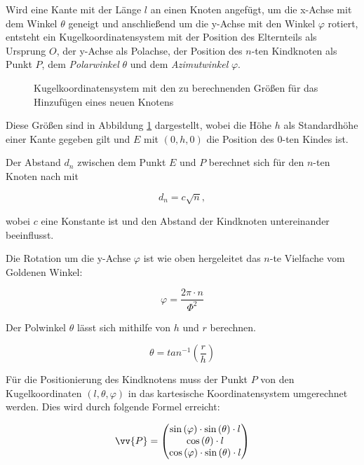 Wird eine Kante mit der Länge $l$ an einen Knoten angefügt, um die x-Achse mit dem Winkel $\theta$ geneigt und anschließend um die y-Achse mit den Winkel $\varphi$ rotiert, entsteht ein Kugelkoordinatensystem mit der Position des Elternteils als Ursprung $O$, der y-Achse als Polachse, der Position des $n$-ten Kindknoten als Punkt $P$, dem \emph{Polarwinkel} $\theta$ und dem \emph{Azimutwinkel} $\varphi$\cite{papula2001mathematik}.

\begin{figure}[htb]
  
  \caption{Kugelkoordinatensystem mit den zu berechnenden Größen für das Hinzufügen eines neuen Knotens}
  \label{fig:spherical-coordinates}
\end{figure}

Diese Größen sind in Abbildung \ref{fig:spherical-coordinates} dargestellt, wobei die Höhe $h$ als Standardhöhe einer Kante gegeben gilt und $E$ mit $(0, h, 0)$ die Position des $0$-ten Kindes ist.

Der Abstand $d_n$ zwischen dem Punkt $E$ und $P$ berechnet sich für den $n$-ten Knoten nach \cite{vogel1979better} mit

\begin{equation}
\label{eq:r}
  d_n = c \sqrt{n},
\end{equation}

wobei $c$ eine Konstante ist und den Abstand der Kindknoten untereinander beeinflusst.

Die Rotation um die y-Achse $\varphi$ ist wie oben hergeleitet das $n$-te Vielfache vom Goldenen Winkel:

\begin{equation}
  \varphi = \frac{2\pi \cdot n}{\Phi^{2}}
\end{equation}

Der Polwinkel $\theta$ lässt sich mithilfe von $h$ und $r$ berechnen.

\begin{equation}
  \theta = tan^{-1} \left(\frac{r}{h}\right)
\end{equation}

Für die Positionierung des Kindknotens muss der Punkt $P$ von den Kugelkoordinaten $(l, \theta, \varphi)$ in das kartesische Koordinatensystem umgerechnet werden. Dies wird durch folgende Formel erreicht:

\begin{equation}
  \vv{P} =
  \begin{pmatrix}
    \sin\left(\varphi\right) \cdot \sin\left(\theta\right) \cdot l\\
    \cos\left(\theta\right) \cdot l\\
    \cos\left(\varphi\right) \cdot \sin\left(\theta\right) \cdot l
  \end{pmatrix}
\end{equation}

